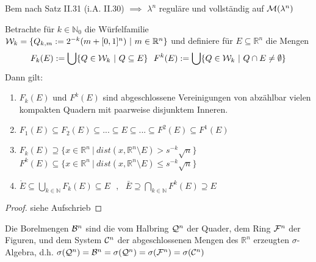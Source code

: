 \documentclass[11pt,a4paper,fleqn,openany]{report}
\begin{document}
    \begin{remark}
      Bem nach Satz II.31 (i.A. II.30) $\implies$ $\lambda^n$ reguläre und vollständig auf $\mathcal{M}(\lambda^n)$
    \end{remark}

    \begin{lemma}
      Betrachte für $k \in \mathbb{N}_0$ die Würfelfamilie $\mathcal{W}_k = \{Q_{k,m} := 2^{-k}(m + [0,1]^n) \ | \ m \in \mathbb{R}^n\}$ und definiere für $E \subseteq \mathbb{R}^n$ die Mengen
      \begin{align*}
      F_k(E) := \bigcup \{Q \in \mathcal{W}_k \ | \ Q \subseteq E\} \ \
      F^k(E) := \bigcup \{Q \in \mathcal{W}_k \ | \ Q \cap E \neq \emptyset\}
      \end{align*}
      Dann gilt:
      \begin{enumerate}[label=\roman*)]
        \item $F_k(E)$ und $F^k(E)$ sind abgeschlossene Vereinigungen von abzählbar vielen kompakten Quadern mit paarweise disjunktem Inneren.
        \item $F_1(E) \subseteq F_2(E) \subseteq ... \subseteq E \subseteq ... \subseteq F^2(E) \subseteq F^1(E)$ 
        \item $F_k(E) \supseteq \{x \in \mathbb{R}^n \ | \ dist(x, \mathbb{R}^n \setminus E) > s^{-k} \sqrt{n}\}$\\
        $F^k(E) \subseteq \{x \in \mathbb{R}^n \ | \ dist(x, \mathbb{R}^n \setminus E) \leq s^{-k} \sqrt{n}\}$
        \item $\mathring{E} \subseteq \bigcup\limits_{k \in \mathbb{N}} F_k(E) \subseteq E \ \ \ , \ \ \ \bar{E} \supseteq \bigcap\limits_{k \in \mathbb{N}} F^k(E) \supseteq E$
      \end{enumerate}
    \end{lemma}

    \begin{proof}
      siehe Aufschrieb
    \end{proof}


    \begin{lemma}
      Die Borelmengen $\mathcal{B}^n$ sind die vom Halbring $\mathcal{Q}^n$ der Quader, dem Ring $\mathcal{F}^n$ der Figuren, und dem System $\mathcal{C}^n$ der abgeschlossenen Mengen des $\mathbb{R}^n$ erzeugten $\sigma$-Algebra, d.h. $\sigma(\mathcal{Q}^n) = \mathcal{B}^n = \sigma(\mathcal{Q}^n) = \sigma(\mathcal{F}^n) = \sigma(\mathcal{C}^n)$
    \end{lemma}
\end{document}
